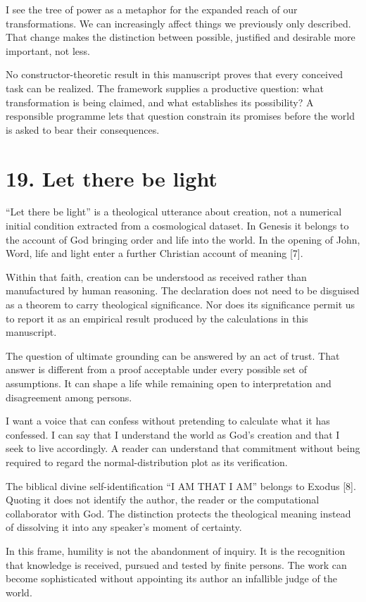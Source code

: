 \documentclass[10pt]{article}
\begin{document}
I see the tree of power as a metaphor for the expanded reach of our transformations. We can increasingly affect things we previously only described. That change makes the distinction between possible, justified and desirable more important, not less.

No constructor-theoretic result in this manuscript proves that every conceived task can be realized. The framework supplies a productive question: what transformation is being claimed, and what establishes its possibility? A responsible programme lets that question constrain its promises before the world is asked to bear their consequences.

\clearpage
\section*{19. Let there be light}
``Let there be light'' is a theological utterance about creation, not a numerical initial condition extracted from a cosmological dataset. In Genesis it belongs to the account of God bringing order and life into the world. In the opening of John, Word, life and light enter a further Christian account of meaning [7].

Within that faith, creation can be understood as received rather than manufactured by human reasoning. The declaration does not need to be disguised as a theorem to carry theological significance. Nor does its significance permit us to report it as an empirical result produced by the calculations in this manuscript.

The question of ultimate grounding can be answered by an act of trust. That answer is different from a proof acceptable under every possible set of assumptions. It can shape a life while remaining open to interpretation and disagreement among persons.

I want a voice that can confess without pretending to calculate what it has confessed. I can say that I understand the world as God's creation and that I seek to live accordingly. A reader can understand that commitment without being required to regard the normal-distribution plot as its verification.

The biblical divine self-identification ``I AM THAT I AM'' belongs to Exodus [8]. Quoting it does not identify the author, the reader or the computational collaborator with God. The distinction protects the theological meaning instead of dissolving it into any speaker's moment of certainty.

In this frame, humility is not the abandonment of inquiry. It is the recognition that knowledge is received, pursued and tested by finite persons. The work can become sophisticated without appointing its author an infallible judge of the world.
\end{document}
